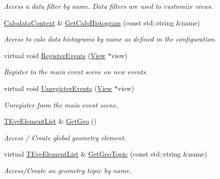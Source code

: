 \begin{DoxyCompactItemize}
\begin{DoxyCompactList}\small\item\em Access a data filter by name. Data filters are used to customize views. \item\end{DoxyCompactList}\item 
\hyperlink{struct_d_d4hep_1_1_display_1_1_calodata_context}{CalodataContext} \& \hyperlink{class_d_d4hep_1_1_display_af4430a139b63c8cf1af60317eefa034a}{GetCaloHistogram} (const std::string \&name)
\begin{DoxyCompactList}\small\item\em Access to calo data histograms by name as defined in the configuration. \item\end{DoxyCompactList}\item 
virtual void \hyperlink{class_d_d4hep_1_1_display_ab1c06999ce5655dc960771f8082a1710}{RegisterEvents} (\hyperlink{class_d_d4hep_1_1_view}{View} $\ast$view)
\begin{DoxyCompactList}\small\item\em Register to the main event scene on new events. \item\end{DoxyCompactList}\item 
virtual void \hyperlink{class_d_d4hep_1_1_display_ab681bf3f69e91271a5c8ec36fb991207}{UnregisterEvents} (\hyperlink{class_d_d4hep_1_1_view}{View} $\ast$view)
\begin{DoxyCompactList}\small\item\em Unregister from the main event scene. \item\end{DoxyCompactList}\item 
\hyperlink{class_t_eve_element_list}{TEveElementList} \& \hyperlink{class_d_d4hep_1_1_display_a6320adb59a4092821ef4623da5547277}{GetGeo} ()
\begin{DoxyCompactList}\small\item\em Access / Create global geometry element. \item\end{DoxyCompactList}\item 
virtual \hyperlink{class_t_eve_element_list}{TEveElementList} \& \hyperlink{class_d_d4hep_1_1_display_af82081597a063fe0752996338919395e}{GetGeoTopic} (const std::string \&name)
\begin{DoxyCompactList}\small\item\em Access/Create an geometry topic by name. \item\end{DoxyCompactList}\item 

\end{DoxyCompactItemize}
